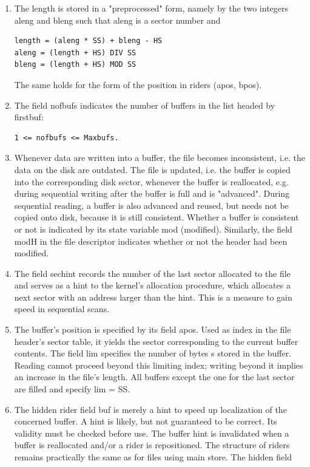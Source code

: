 \begin{enumerate}
	\item The length is stored in a "preprocessed" form, namely by the two integers aleng and bleng
such that aleng is a sector number and
\begin{verbatim}
length = (aleng * SS) + bleng - HS
aleng = (length + HS) DIV SS
bleng = (length + HS) MOD SS
\end{verbatim}
The same holds for the form of the position in riders (apos, bpos).
	\item The field nofbufs indicates the number of buffers in the list headed by firstbuf:
\begin{verbatim}
1 <= nofbufs <= Maxbufs.
\end{verbatim}
	\item Whenever data are written into a buffer, the file becomes inconsistent, i.e. the data on the disk
are outdated. The file is updated, i.e. the buffer is copied into the corresponding disk sector,
whenever the buffer is reallocated, e.g. during sequential writing after the buffer is full and is
"advanced". During sequential reading, a buffer is also advanced and reused, but needs not be
copied onto disk, because it is still consistent. Whether a buffer is consistent or not is indicated by
its state variable mod (modified). Similarly, the field modH in the file descriptor indicates whether
or not the header had been modified.
	\item The field sechint records the number of the last sector allocated to the file and serves as a hint
to the kernel's allocation procedure, which allocates a next sector with an address larger than the
hint. This is a measure to gain speed in sequential scans.
	\item The buffer's position is specified by its field apos. Used as index in the file header's sector
table, it yields the sector corresponding to the current buffer contents. The field lim specifies the
number of bytes s stored in the buffer. Reading cannot proceed beyond this limiting index; writing
beyond it implies an increase in the file's length. All buffers except the one for the last sector are
filled and specify lim = SS.
	\item The hidden rider field buf is merely a hint to speed up localization of the concerned buffer. A
hint is likely, but not guaranteed to be correct. Its validity must be checked before use. The buffer
hint is invalidated when a buffer is reallocated and/or a rider is repositioned.
The structure of riders remains practically the same as for files using main store. The hidden field

\end{enumerate}
